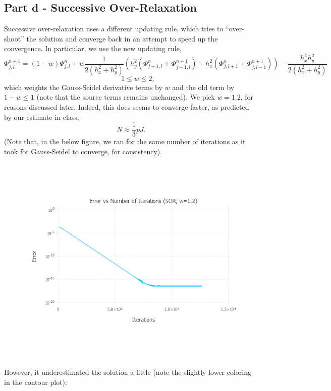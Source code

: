 \documentclass{article}
\begin{document}
\subsection{Part d - Successive Over-Relaxation}
Successive over-relaxation uses a different updating rule, which tries to ``over-shoot'' the solution and converge back in an attempt to speed up the convergence. In particular, we use the new updating rule,
$$\Phi^{n+1}_{j,l} = (1-w)\Phi^{n}_{j,l} + w\frac{1}{2(h_x^2 + h_y^2)}(h_y^2(\Phi^{n}_{j+1,l} + \Phi^{n+1}_{j-1,l}) + h_x^2(\Phi^{n}_{j,l+1} + \Phi^{n+1}_{j,l-1})) - \frac{h_x^2h_y^2}{2(h_x^2 + h_y^2)}$$
$$\qquad 1 \leq w \leq 2,$$
which weights the Gauss-Seidel derivative terms by $w$ and the old term by $1-w \leq 1$ (note that the source terms remains unchanged). We pick $w=1.2$, for reasons discussed later. Indeed, this does seems to converge faster, as predicted by our estimate in class,
$$N \approx \frac{1}{3}pJ.$$
(Note that, in the below figure, we ran for the same number of iterations as it took for Gauss-Seidel to converge, for consistency).
\begin{figure}[H]
	\includegraphics[width=6in,height=4in]{"q2_sor_error"}
\end{figure}

However, it underestimated the solution a little (note the slightly lower coloring in the contour plot):
\end{document}
